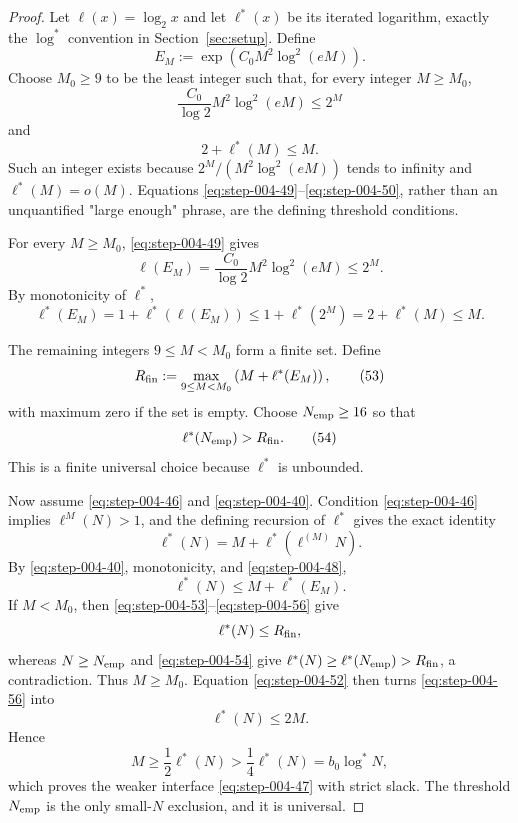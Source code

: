 \begin{proof}

Let \(\ell(x)=\log_2 x\) and let \(\ell^*(x)\) be its iterated logarithm, exactly the \(\log^*\) convention in Section~\ref{sec:setup}. Define
\[
E_M:=\exp\!\left(C_0M^2\log^2(eM)\right).
\tag{48}\label{eq:step-004-48}
\]
Choose \(M_0\ge 9\) to be the least integer such that, for every integer \(M\ge M_0\),
\[
\frac{C_0}{\log2}M^2\log^2(eM)\le2^M
\tag{49}\label{eq:step-004-49}
\]
and
\[
2+\ell^*(M)\le M.
\tag{50}\label{eq:step-004-50}
\]
Such an integer exists because \(2^M/(M^2 \log^2(eM))\) tends to infinity and \(\ell^*(M)=o(M)\). Equations \eqref{eq:step-004-49}--\eqref{eq:step-004-50}, rather than an unquantified "large enough" phrase, are the defining threshold conditions.

For every \(M\ge M_0\), \eqref{eq:step-004-49} gives
\[
\ell(E_M)
=\frac{C_0}{\log2}M^2\log^2(eM)
\le2^M.
\tag{51}\label{eq:step-004-51}
\]
By monotonicity of \(\ell^*\),
\[
\ell^*(E_M)
=1+\ell^*(\ell(E_M))
\le1+\ell^*(2^M)
=2+\ell^*(M)
\le M.
\tag{52}\label{eq:step-004-52}
\]

The remaining integers \(9\le M<M_0\) form a finite set. Define
\[
R_{\rm fin}
:=\max_{9\le M<M_0}
\left(M+\ell^*(E_M)\right),
\tag{53}\label{eq:step-004-53}
\]
with maximum zero if the set is empty. Choose \(N_{\rm emp}\ge 16\) so that
\[
\ell^*(N_{\rm emp})>R_{\rm fin}.
\tag{54}\label{eq:step-004-54}
\]
This is a finite universal choice because \(\ell^*\) is unbounded.

Now assume \eqref{eq:step-004-46} and \eqref{eq:step-004-40}. Condition \eqref{eq:step-004-46} implies \(\ell^{M}(N)>1\), and the defining recursion of \(\ell^*\) gives the exact identity
\[
\ell^*(N)=M+\ell^*(\ell^{(M)}N).
\tag{55}\label{eq:step-004-55}
\]
By \eqref{eq:step-004-40}, monotonicity, and \eqref{eq:step-004-48},
\[
\ell^*(N)\le M+\ell^*(E_M).
\tag{56}\label{eq:step-004-56}
\]
If \(M<M_0\), then \eqref{eq:step-004-53}--\eqref{eq:step-004-56} give
\[
\ell^*(N)\le R_{\rm fin},
\]
whereas \(N\ge N_{\rm emp}\) and \eqref{eq:step-004-54} give
\(\ell^*(N)\ge \ell^*(N_{\rm emp})>R_{\rm fin}\), a contradiction. Thus \(M\ge M_0\). Equation \eqref{eq:step-004-52} then turns \eqref{eq:step-004-56} into
\[
\ell^*(N)\le2M.
\tag{57}\label{eq:step-004-57}
\]
Hence
\[
M\ge\frac12\ell^*(N)>\frac14\ell^*(N)=b_0\log^*N,
\tag{58}\label{eq:step-004-58}
\]
which proves the weaker interface \eqref{eq:step-004-47} with strict slack. The threshold \(N_{\rm emp}\) is the only small-\(N\) exclusion, and it is universal.

\end{proof}


